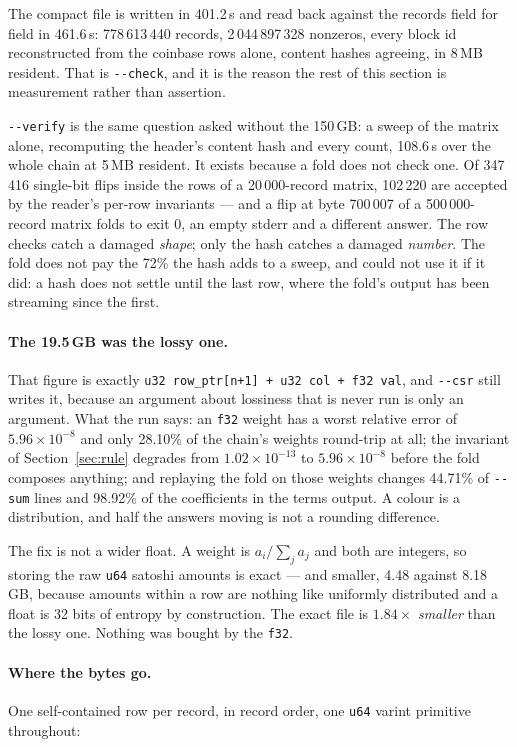 \documentclass[11pt,a4paper]{article}
\newcommand{\flag}[1]{\texttt{-{}-#1}}
\begin{document}
The compact file is written in 401.2\,s and read back against the records field
for field in 461.6\,s: 778\,613\,440 records, 2\,044\,897\,328 nonzeros, every
block id reconstructed from the coinbase rows alone, content hashes agreeing, in
8\,MB resident. That is \flag{check}, and it is the reason the rest of this
section is measurement rather than assertion.

\flag{verify} is the same question asked without the 150\,GB: a sweep of the
matrix alone, recomputing the header's content hash and every count, 108.6\,s
over the whole chain at 5\,MB resident. It exists because a fold does not check
one. Of 347\,416 single-bit flips inside the rows of a 20\,000-record matrix,
102\,220 are accepted by the reader's per-row invariants --- and a flip at byte
700\,007 of a 500\,000-record matrix folds to exit 0, an empty stderr and a
different answer. The row checks catch a damaged \emph{shape}; only the hash
catches a damaged \emph{number}. The fold does not pay the 72\% the hash adds to
a sweep, and could not use it if it did: a hash does not settle until the last
row, where the fold's output has been streaming since the first.

\paragraph{The 19.5\,GB was the lossy one.} That figure is exactly
\texttt{u32 row\_ptr[n+1] + u32 col + f32 val}, and \flag{csr} still writes it,
because an argument about lossiness that is never run is only an argument. What
the run says: an \texttt{f32} weight has a worst relative error of
$5.96\times10^{-8}$ and only 28.10\% of the chain's weights round-trip at all;
the invariant of Section~\ref{sec:rule} degrades from $1.02\times10^{-13}$ to
$5.96\times10^{-8}$ before the fold composes anything; and replaying the fold on
those weights changes 44.71\% of \flag{sum} lines and 98.92\% of the coefficients
in the terms output. A colour is a distribution, and half the answers moving is
not a rounding difference.

The fix is not a wider float. A weight is $a_i / \sum_j a_j$ and both are
integers, so storing the raw \texttt{u64} satoshi amounts is exact --- and
smaller, 4.48 against 8.18\,GB, because amounts within a row are nothing like
uniformly distributed and a float is 32 bits of entropy by construction. The
exact file is $1.84\times$ \emph{smaller} than the lossy one. Nothing was bought
by the \texttt{f32}.

\paragraph{Where the bytes go.} One self-contained row per record, in record
order, one \texttt{u64} varint primitive throughout:
\end{document}
